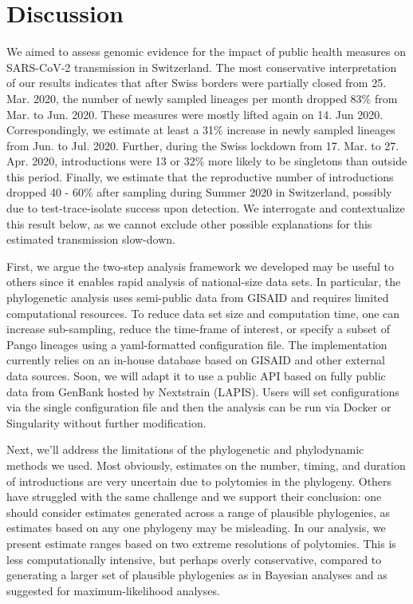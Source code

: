 \documentclass[9pt,twoside,lineno]{pnas-new} %
\begin{document}
\section{Discussion}
We aimed to assess genomic evidence for the impact of public health measures on SARS-CoV-2 transmission in Switzerland. The most conservative interpretation of our results indicates that after Swiss borders were partially closed from 25. Mar. 2020, the number of newly sampled lineages per month dropped 83\% from Mar. to Jun. 2020. These measures were mostly lifted again on 14. Jun 2020. Correspondingly, we estimate at least a 31\% increase in newly sampled lineages from Jun. to Jul. 2020. Further, during the Swiss lockdown from 17. Mar. to 27. Apr. 2020, introductions were 13 or 32\% more likely to be singletons than outside this period. Finally, we estimate that the reproductive number of introductions dropped 40 - 60\% after sampling during Summer 2020 in Switzerland, possibly due to test-trace-isolate success upon detection. We interrogate and contextualize this result below, as we cannot exclude other possible explanations for this estimated transmission slow-down.

First, we argue the two-step analysis framework we developed may be useful to others since it enables rapid analysis of national-size data sets. In particular, the phylogenetic analysis uses semi-public data from GISAID and requires limited computational resources. To reduce data set size and computation time, one can increase sub-sampling, reduce the time-frame of interest, or specify a subset of Pango lineages using a yaml-formatted configuration file. The implementation currently relies on an in-house database based on GISAID and other external data sources. Soon, we will adapt it to use a public API based on fully public data from GenBank hosted by Nextstrain (LAPIS). Users will set configurations via the single configuration file and then the analysis can be run via Docker or Singularity without further modification.

Next, we'll address the limitations of the phylogenetic and phylodynamic methods we used. Most obviously, estimates on the number, timing, and duration of introductions are very uncertain due to polytomies in the phylogeny. Others have struggled with the same challenge \cite{Morel2021} and we support their conclusion: one should consider estimates generated across a range of plausible phylogenies, as estimates based on any one phylogeny may be misleading. In our analysis, we present estimate ranges based on two extreme resolutions of polytomies. This is less computationally intensive, but perhaps overly conservative, compared to generating a larger set of plausible phylogenies as in Bayesian analyses and as \cite{Morel2021} suggested for maximum-likelihood analyses.
\end{document}
